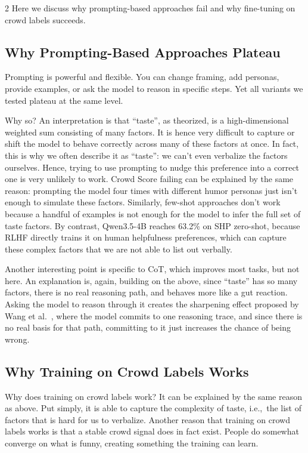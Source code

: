 \documentclass[10pt, a4paper]{article}
\begin{document}
\begin{multicols}{2}
Here we discuss why prompting-based approaches fail and why fine-tuning on crowd labels succeeds.

\subsection{Why Prompting-Based Approaches Plateau}

Prompting is powerful and flexible. You can change framing, add personas, provide examples, or ask the model to reason in specific steps. Yet all variants we tested plateau at the same level.

Why so? An interpretation is that ``taste'', as theorized, is a high-dimensional weighted sum consisting of many factors. It is hence very difficult to capture or shift the model to behave correctly across many of these factors at once. In fact, this is why we often describe it as ``taste'': we can't even verbalize the factors ourselves. Hence, trying to use prompting to nudge this preference into a correct one is very unlikely to work. Crowd Score \cite{goes2022} failing can be explained by the same reason: prompting the model four times with different humor personas just isn't enough to simulate these factors. Similarly, few-shot approaches don't work because a handful of examples is not enough for the model to infer the full set of taste factors. By contrast, Qwen3.5-4B reaches 63.2\% on SHP zero-shot, because RLHF directly trains it on human helpfulness preferences, which can capture these complex factors that we are not able to list out verbally.

Another interesting point is specific to CoT, which improves most tasks, but not here. An explanation is, again, building on the above, since ``taste'' has so many factors, there is no real reasoning path, and behaves more like a gut reaction. Asking the model to reason through it creates the sharpening effect proposed by Wang et al.\ \cite{wang2025}, where the model commits to one reasoning trace, and since there is no real basis for that path, committing to it just increases the chance of being wrong.

\subsection{Why Training on Crowd Labels Works}

Why does training on crowd labels work? It can be explained by the same reason as above. Put simply, it is able to capture the complexity of taste, i.e.,\ the list of factors that is hard for us to verbalize. Another reason that training on crowd labels works is that a stable crowd signal does in fact exist. People do somewhat converge on what is funny, creating something the training can learn.


\end{multicols}
\end{document}

